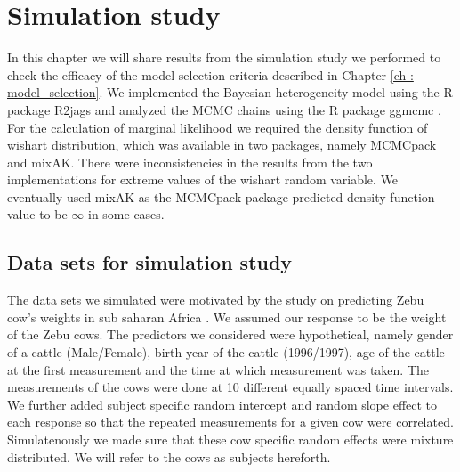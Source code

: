 
\chapter{Simulation study}
\label{ch : simulation_study}

In this chapter we will share results from the simulation study we performed to check the efficacy of the model selection criteria described in Chapter \ref{ch : model_selection}. We implemented the Bayesian heterogeneity model using the R package R2jags \citep{su_r2jags:_2015} and analyzed the MCMC chains using the R package ggmcmc \citep{marin_ggmcmc:_2016}. For the calculation of marginal likelihood we required the density function of wishart distribution, which was available in two packages, namely MCMCpack and mixAK. There were inconsistencies in the results from the two implementations for extreme values of the wishart random variable. We eventually used mixAK \citep{komarek_mixak:_2015} as the MCMCpack package predicted density function value to be $\infty$ in some cases.

\section{Data sets for simulation study}
The data sets we simulated were motivated by the study on predicting Zebu cow's weights in sub saharan Africa \citep{lesosky_live_2012}. We assumed our response to be the weight of the Zebu cows. The predictors we considered were hypothetical, namely gender of a cattle (Male/Female), birth year of the cattle (1996/1997), age of the cattle at the first measurement and the time at which measurement was taken. The measurements of the cows were done at 10 different equally spaced time intervals. We further added subject specific random intercept and random slope effect to each response so that the repeated measurements for a given cow were correlated. Simulatenously we made sure that these cow specific random effects were mixture distributed. We will refer to the cows as subjects hereforth.

